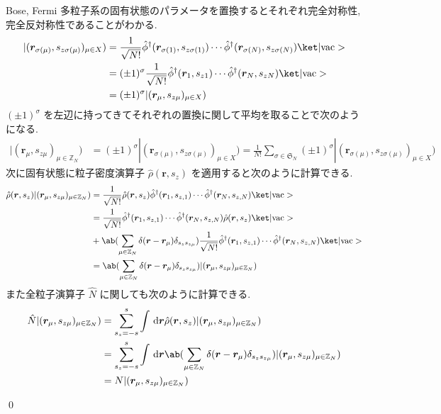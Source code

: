 \documentclass[uplatex,dvipdfmx,a4paper,11pt]{jlreq}
\makeatletter
\newcommand{\ZZ}{\mathbb{Z}}
\renewcommand{\SS}{\mathfrak{S}}
\newcommand{\rr}{\bm{r}}
\numberwithin{equation}{section}
\theoremstyle{definition}
\renewenvironment{proof}[1][\proofname]{\par
  \normalfont
  \topsep6\p@\@plus6\p@ \trivlist
  \item[\hskip\labelsep{\bfseries #1}\@addpunct{\bfseries}]\ignorespaces\quad\par
}{
  \qed\endtrivlist\@endpefalse
}
\renewcommand\proofname{証明}
\makeatother
\begin{document}
\begin{proof}
  Bose, Fermi 多粒子系の固有状態のパラメータを置換するとそれぞれ完全対称性, 完全反対称性であることがわかる.
  \begin{align}
    |(\rr_{\sigma(\mu)}, s_{z\sigma(\mu)})_{\mu\in X}) & = \frac{1}{\sqrt{N!}}\hat{\phi}^\dagger(\rr_{\sigma(1)}, s_{z\sigma(1)})\cdots\hat{\phi}^\dagger(\rr_{\sigma(N)}, s_{z\sigma(N)})\ket|\mathrm{vac}> \\
                                                       & = (\pm 1)^\sigma\frac{1}{\sqrt{N!}}\hat{\phi}^\dagger(\rr_1, s_{z1})\cdots\hat{\phi}^\dagger(\rr_N, s_{zN})\ket|\mathrm{vac}>                       \\
                                                       & = (\pm 1)^\sigma|(\rr_{\mu}, s_{z\mu})_{\mu\in X})
  \end{align}
  $(\pm 1)^\sigma$ を左辺に持ってきてそれぞれの置換に関して平均を取ることで次のようになる.
  \begin{align}
    |(\rr_{\mu}, s_{z\mu})_{\mu\in\ZZ_N}) & = (\pm 1)^\sigma|(\rr_{\sigma(\mu)}, s_{z\sigma(\mu)})_{\mu\in X}) = \frac{1}{N!}\sum_{\sigma\in\SS_N}(\pm 1)^\sigma|(\rr_{\sigma(\mu)}, s_{z\sigma(\mu)})_{\mu\in X})
  \end{align}
  次に固有状態に粒子密度演算子 $\hat{\rho}(\rr, s_z)$ を適用すると次のように計算できる.
  \begin{align}
    \hat{\rho}(\rr, s_z)|(\rr_\mu, s_{z\mu})_{\mu\in\ZZ_N}) & = \frac{1}{\sqrt{N!}}\hat{\rho}(\rr, s_z)\hat{\phi}^\dagger(\rr_1, s_{z,1})\cdots\hat{\phi}^\dagger(\rr_N, s_{z,N})\ket|\mathrm{vac}>                                             \\
                                                            & = \frac{1}{\sqrt{N!}}\hat{\phi}^\dagger(\rr_1, s_{z,1})\cdots\hat{\phi}^\dagger(\rr_N, s_{z,N})\hat{\rho}(\rr, s_z)\ket|\mathrm{vac}>                                             \\
                                                            & + \ab(\sum_{\mu\in\ZZ_N}\delta(\rr - \rr_\mu)\delta_{s_zs_{z\mu}})\frac{1}{\sqrt{N!}}\hat{\phi}^\dagger(\rr_1, s_{z,1})\cdots\hat{\phi}^\dagger(\rr_N, s_{z,N})\ket|\mathrm{vac}> \\
                                                            & = \ab(\sum_{\mu\in\ZZ_N}\delta(\rr - \rr_\mu)\delta_{s_zs_{z\mu}})|(\rr_\mu, s_{z\mu})_{\mu\in\ZZ_N})
  \end{align}
  また全粒子演算子 $\hat{N}$ に関しても次のように計算できる.
  \begin{align}
    \hat{N}|(\rr_\mu, s_{z\mu})_{\mu\in\ZZ_N}) & = \sum_{s_z = -s}^{s}\int\dl{\rr}\hat{\rho}(\rr, s_z)|(\rr_\mu, s_{z\mu})_{\mu\in\ZZ_N})                                             \\
                                               & = \sum_{s_z = -s}^{s}\int\dl{\rr}\ab(\sum_{\mu\in\ZZ_N}\delta(\rr - \rr_\mu)\delta_{s_zs_{z\mu}})|(\rr_\mu, s_{z\mu})_{\mu\in\ZZ_N}) \\
                                               & = N|(\rr_\mu, s_{z\mu})_{\mu\in\ZZ_N})
  \end{align}
\end{proof}
\end{document}
